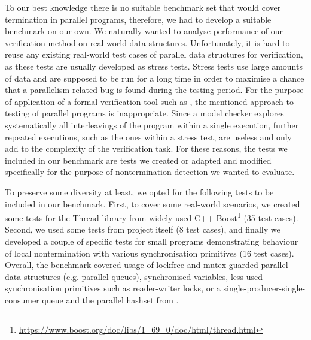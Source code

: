 To our best knowledge there is no suitable benchmark set that would cover
termination in parallel programs, therefore, we had to develop a suitable
benchmark on our own. We naturally wanted to analyse performance of our
verification method on real-world data structures. Unfortunately, it is hard to
reuse any existing real-world test cases of parallel data structures for
verification, as these tests are usually developed as stress tests. Stress
tests use large amounts of data and are supposed to be run for a long time in
order to maximise a chance that a parallelism-related bug is found during the
testing period. For the purpose of application of a formal verification tool such
as \divine, the mentioned approach to testing of parallel programs is
inappropriate. Since a model checker explores systematically all interleavings
of the program within a single execution, further repeated executions, such as
the ones within a stress test, are useless and only add to the complexity of
the verification task. For these reasons, the tests we included in our benchmark
are tests we created or adapted and modified specifically for the purpose of
nontermination detection we wanted to evaluate.

To preserve some diversity at least, we opted for the following tests to be
included in our benchmark.  First, to cover some real-world scenarios, we
created some tests for the Thread library from widely used C++
Boost\footnote{\url{https://www.boost.org/doc/libs/1_69_0/doc/html/thread.html}}
(35 test cases). Second, we used some tests from \divine project itself (8 test
cases), and finally we developed a couple of specific tests for small programs
demonstrating behaviour of local nontermination with various synchronisation
primitives (16 test cases). Overall, the benchmark covered usage of lockfree and
mutex guarded parallel data structures (e.g. parallel queues), synchronised
variables, less-used synchronisation primitives such as reader-writer locks, or
a single-producer-single-consumer queue and the parallel hashset from
\cite{BRSW15HS}.

